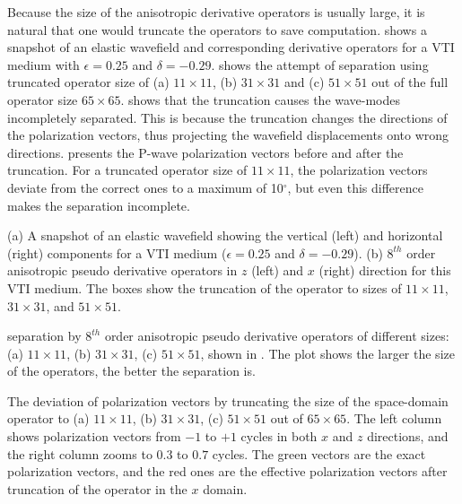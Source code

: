 Because the size of the anisotropic derivative operators is usually
large, it is natural that one would truncate the operators to save
computation.   shows a snapshot of an elastic wavefield
and corresponding derivative operators for a VTI medium with
$\epsilon=0.25$ and $\delta=-0.29$.   shows the
attempt of separation using truncated operator size of (a)
$11\times11$, (b) $31\times31$ and (c) $51\times51$ out of the full
operator size $65\times65$.  shows that the truncation
causes the wave-modes incompletely separated. This is because the
truncation changes the directions of the polarization vectors, thus
projecting the wavefield displacements onto wrong directions.
 presents
the P-wave polarization vectors before and after the truncation.  For
a truncated operator size of $11\times11$, the polarization vectors
deviate from the correct ones to a maximum of 10$^\circ$, but
even this difference makes the separation incomplete.



 {(a) A snapshot of an
  elastic wavefield showing the vertical (left) and horizontal (right)
  components for a VTI medium ($\epsilon=0.25$ and
  $\delta=-0.29$). (b) $8^{th}$ order anisotropic pseudo derivative
  operators in $z$ (left) and $x$ (right) direction for this VTI
  medium. The boxes show the truncation of the operator to sizes of
  $11\times11$, $31\times31$, and $51\times51$.}

{separation by $8^{th}$ order anisotropic pseudo derivative operators
of different sizes: (a) $11\times11$, (b) $31\times31$, (c)
$51\times51$, shown in {}. {The plot shows the
larger the size of the operators, the better the separation is.}}






{The deviation of polarization vectors by truncating the size of the
  space-domain operator to (a) $11\times11$, (b) $31\times31$, (c)
  $51\times51$ out of $65\times65$. The left column shows polarization
  vectors from ${-1}$ to ${+1}$ cycles in both $x$ and $z$
  directions, and the right column zooms to $0.3$ to $0.7$ cycles. The
  green vectors are the exact polarization vectors, and the red ones
  are the effective polarization vectors after truncation of the
  operator in the $x$ domain.}





